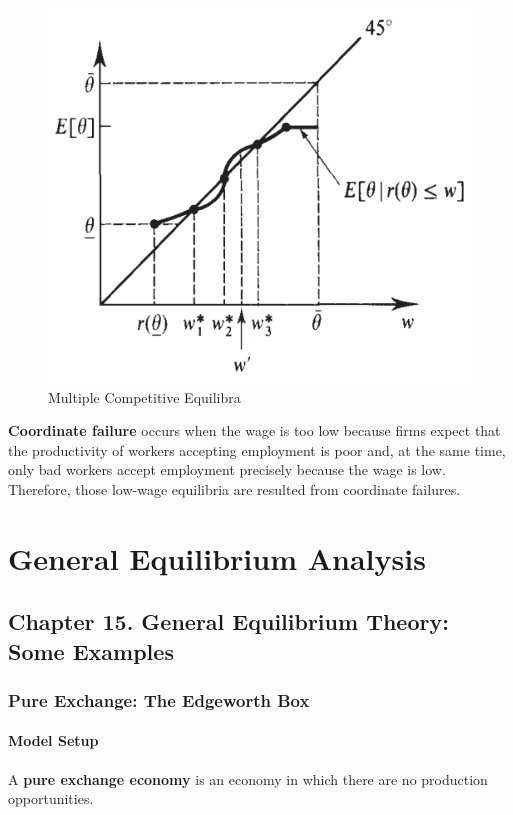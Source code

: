 \documentclass{report}
\begin{document}
		\begin{figure}[h]
			\centering
			\includegraphics[width=0.4\linewidth]{figures/multiple_competitive_eq.png}
			\caption{Multiple Competitive Equilibra}
		\end{figure}
		
		\begin{definition}
			\textbf{Coordinate failure} occurs when the wage is too low because firms expect that the productivity of workers accepting employment is poor and, at the same time, only bad workers accept employment precisely because the wage is low. Therefore, those low-wage equilibria are resulted from coordinate failures.
		\end{definition}
	
	\chapter{General Equilibrium Analysis}
	\section{Chapter 15. General Equilibrium Theory: Some Examples}
		\subsection{Pure Exchange: The Edgeworth Box}
		\subsubsection{Model Setup}
		\begin{definition}
			A \textbf{pure exchange economy} is an economy in which there are no production opportunities.
		\end{definition}
		
\end{document}
